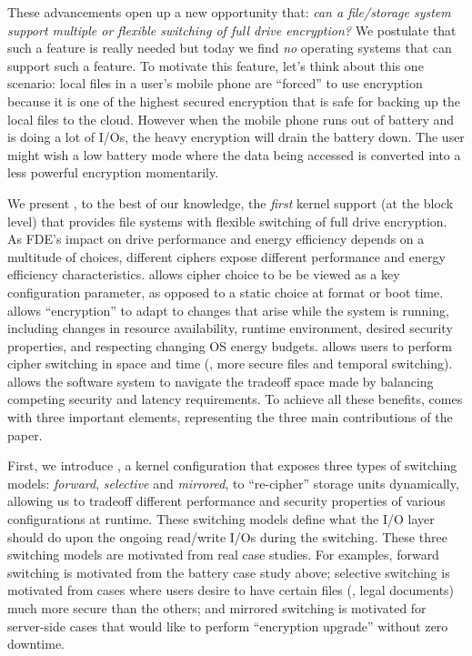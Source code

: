 These advancements open up a new opportunity that: {\em can a file/storage
system support multiple or flexible switching of full drive encryption?} We
postulate that such a feature is really needed but today we find {\em no}
operating systems that can support such a feature. To motivate this feature,
let's think about this one scenario: local files in a user's mobile phone are
``forced'' to use encryption \encA because it is one of the highest secured
encryption that is safe for backing up the local files to the cloud. However
when the mobile phone runs out of battery and is doing a lot of I/Os, the heavy
encryption will drain the battery down. The user might wish a low battery mode
where the data being accessed is converted into a less powerful encryption
momentarily.




We present \sys, to the best of our knowledge, the {\em first} kernel support
(at the block level) that provides file systems with flexible switching of full
drive encryption. As FDE's impact on drive performance and energy efficiency
depends on a multitude of choices, different ciphers expose different
performance and energy efficiency characteristics. \sys allows cipher choice to
be be viewed as a key configuration parameter, as opposed to a static choice at
format or boot time. \sys allows ``encryption'' to adapt to changes that arise
while the system is running, including changes in resource availability, runtime
environment, desired security properties, and respecting changing OS energy
budgets. \sys allows users to perform cipher switching in space and time (\eg,
more secure files and temporal switching). \sys allows the software system to
navigate the tradeoff space made by balancing competing security and latency
requirements.  To achieve all these benefits, \sys comes with three important
elements, representing the three main contributions of the paper.


First, we introduce \sysA, a kernel configuration that exposes three types of
switching models: {\em forward}, {\em selective} and {\em mirrored}, to
``re-cipher'' storage units dynamically, allowing us to tradeoff different
performance and security properties of various configurations at runtime. These
switching models define what the I/O layer should do upon the ongoing read/write
I/Os during the switching. These three switching models are motivated from real
case studies. For examples, forward switching is motivated from the battery case
study above; selective switching is motivated from cases where users desire to
have certain files (\eg, legal documents) much more secure than the others; and
mirrored switching is motivated for server-side cases that would like to perform
``encryption upgrade'' without zero downtime.


